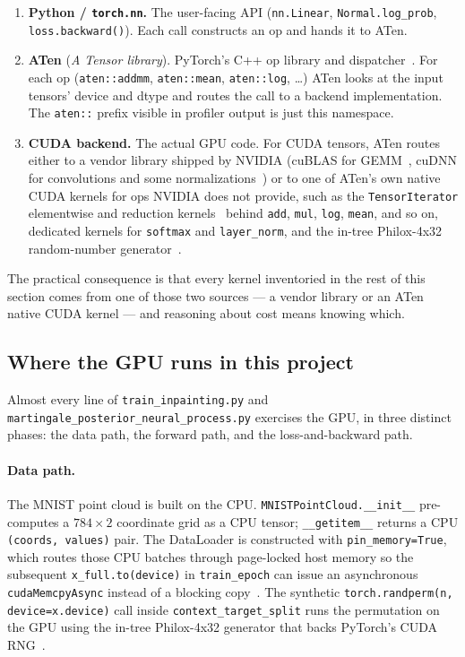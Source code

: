 \documentclass[11pt]{article}
\begin{document}
\begin{enumerate}
	\item \textbf{Python / \texttt{torch.nn}.} The user-facing API
	      (\texttt{nn.Linear}, \texttt{Normal.log\_prob},
	      \texttt{loss.backward()}). Each call constructs an op and hands it
	      to ATen.
	\item \textbf{ATen} (\emph{A Tensor library}). PyTorch's C++ op
	      library and dispatcher~\cite{atencppdocs,pytorchdispatcher}. For each
	      op (\texttt{aten::addmm}, \texttt{aten::mean}, \texttt{aten::log},
	      \ldots) ATen looks at the input tensors' device and dtype and
	      routes the call to a backend implementation. The \texttt{aten::}
	      prefix visible in profiler output is just this namespace.
	\item \textbf{CUDA backend.} The actual GPU code. For CUDA tensors,
	      ATen routes either to a vendor library shipped by NVIDIA
	      (cuBLAS for GEMM~\cite{cublas}, cuDNN for convolutions and some
	      normalizations~\cite{cudnn})
	      or to one of ATen's own native CUDA kernels for ops NVIDIA does
	      not provide, such as the \texttt{TensorIterator} elementwise and
	      reduction kernels~\cite{ezyang} behind \texttt{add}, \texttt{mul},
	      \texttt{log}, \texttt{mean}, and so on, dedicated kernels for
	      \texttt{softmax} and \texttt{layer\_norm}, and the in-tree
	      Philox-4x32 random-number generator~\cite{cudasem}.
\end{enumerate}

The practical consequence is that every kernel inventoried in the rest
of this section comes from one of those two sources --- a vendor
library or an ATen native CUDA kernel --- and reasoning about cost
means knowing which.

\subsection{Where the GPU runs in this project}\label{subsec:where}

Almost every line of
\texttt{train\_inpainting.py} and
\texttt{martingale\_posterior\_neural\_process.py} exercises
the GPU, in three distinct phases: the data path, the forward path,
and the loss-and-backward path.

\paragraph{Data path.} The MNIST point cloud is built on the CPU\@.
\texttt{MNISTPointCloud.\_\_init\_\_} pre-computes a $784 \times 2$
coordinate grid as a CPU tensor; \texttt{\_\_getitem\_\_} returns a
CPU \texttt{(coords, values)} pair. The DataLoader is constructed
with \texttt{pin\_memory=True}, which routes those CPU batches through
page-locked host memory so the subsequent \verb|x_full.to(device)| in
\texttt{train\_epoch} can issue an asynchronous \texttt{cudaMemcpyAsync}
instead of a blocking copy~\cite{cudasem}. The synthetic
\texttt{torch.randperm(n, device=x.device)} call inside
\texttt{context\_target\_split} runs the permutation on the GPU using
the in-tree Philox-4x32 generator that backs PyTorch's CUDA RNG~\cite{curand}.
\end{document}
